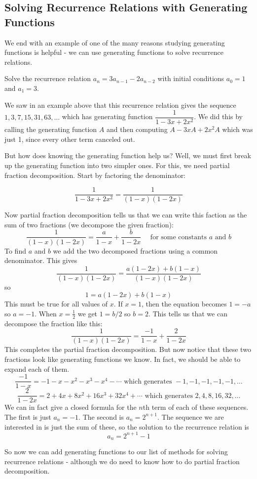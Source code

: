 \documentclass[12pt]{article}
\begin{document}
\subsection{Solving Recurrence Relations with Generating Functions}
We end with an example of one of the many reasons studying generating functions is helpful - we can use generating functions to solve recurrence relations.

\begin{example}
 Solve the recurrence relation $a_n = 3a_{n-1} - 2a_{n-2}$ with initial conditions $a_0 = 1$ and $a_1 = 3$.  
 
 \begin{solution}
  We saw in an example above that this recurrence relation gives the sequence $1, 3, 7, 15, 31, 63, \ldots$ which has generating function $\dfrac{1}{1 - 3x + 2x^2}$.  We did this by calling the generating function $A$ and then computing $A - 3xA + 2x^2A$ which was just 1, since every other term canceled out.  
  
  But how does knowing the generating function help us?  Well, we must first break up the generating function into two simpler ones.  For this, we need partial fraction decomposition. Start by factoring the denominator:
  
  \[\frac{1}{1-3x + 2x^2} = \frac{1}{(1-x)(1-2x)}\]
  
  Now partial fraction decomposition tells us that we can write this faction as the sum of two fractions (we decompose the given fraction):
  \[\frac{1}{(1-x)(1-2x)} = \frac{a}{1-x} + \frac{b}{1-2x} \mbox{ ~~ for some constants $a$ and $b$}\]
  To find $a$ and $b$ we add the two decomposed fractions using a common denominator.  This gives
  \[\frac{1}{(1-x)(1-2x)} = \frac{a(1-2x) + b(1-x)}{(1-x)(1-2x)}\]
  so
  \[1 = a(1-2x) + b(1-x)\]
  This must be true for all values of $x$.  If $x = 1$, then the equation becomes $1 = -a$ so $a = -1$.  When $x = \frac{1}{2}$ we get $1 = b/2$ so $b = 2$.  This tells us that we can decompose the fraction like this:
  \[\frac{1}{(1-x)(1-2x)} = \frac{-1}{1-x} + \frac{2}{1-2x}\]
  This completes the partial fraction decomposition.  But now notice that these two fractions look like generating functions we know.  In fact, we should be able to expand each of them.
  \[\frac{-1}{1-x} = -1 - x - x^2 -x^3 - x^4 - \cdots \mbox{ which generates } -1, -1, -1, -1, -1, \ldots\]
  \[\frac{2}{1-2x} = 2 + 4x + 8x^2 + 16x^3 + 32x^4 + \cdots \mbox{ which generates } 2, 4, 8, 16, 32, \ldots\]
  We can in fact give a closed formula for the $n$th term of each of these sequences.  The first is just $a_n = -1$.  The second is $a_n = 2^{n+1}$.  The sequence we are interested in is just the sum of these, so the solution to the recurrence relation is 
  \[a_n = 2^{n+1} - 1\]
 \end{solution}

\end{example}
  
So now we can add generating functions to our list of methods for solving recurrence relations - although we do need to know how to do partial fraction decomposition.
\end{document}
